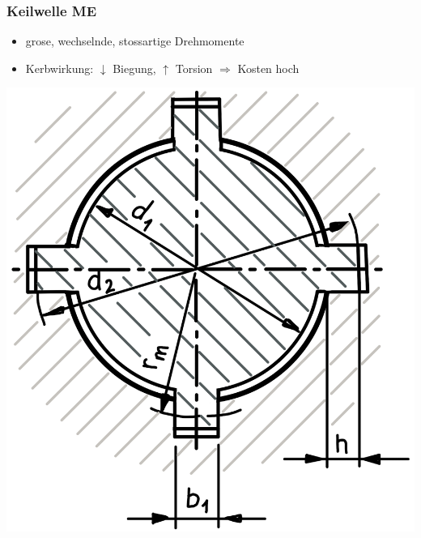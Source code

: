 \subsubsection{Keilwelle \hfill ME}
    \begin{scriptsize}
        \begin{itemize}
            \item grose, wechselnde, stossartige Drehmomente
            \item Kerbwirkung: $\downarrow$ Biegung, $\uparrow$ Torsion $\Rightarrow$ Kosten hoch
        \end{itemize}
    \end{scriptsize}
    \begin{minipage}{0.36\linewidth}
        \begin{center}
            \includegraphics[width = 1.0\linewidth]{src/images/MAEIP_Keilwelle}
        \end{center}
    \end{minipage}
